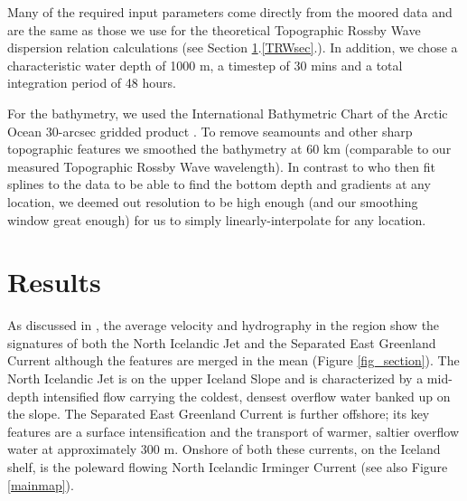 \documentclass[12pt,titlepage,figuresatend]{article}
\begin{document}
Many of the required input parameters come directly from the moored data and are the same as those we use for the theoretical Topographic Rossby Wave dispersion relation calculations (see Section \ref{results}.\ref{TRWsec}.). In addition, we chose a characteristic water depth of 1000 m, a timestep of 30 mins and a total integration period of 48 hours.

For the bathymetry, we used the International Bathymetric Chart of the Arctic Ocean 30-arcsec gridded product \cite[]{Jakobsson2012}. To remove seamounts and other sharp topographic features we smoothed the bathymetry at 60 km (comparable to our measured Topographic Rossby Wave wavelength). In contrast to \cite{Pickart1995} who then fit splines to the data to be able to find the bottom depth and gradients at any location, we deemed out resolution to be high enough (and our smoothing window great enough) for us to simply linearly-interpolate for any location.

\section{Results}
\label{results}

As discussed in \cite{Harden2016}, the average velocity and hydrography in the region show the signatures of both the North Icelandic Jet and the Separated East Greenland Current although the features are merged in the mean (Figure \ref{fig_section}). The North Icelandic Jet is on the upper Iceland Slope and is characterized by a mid-depth intensified flow carrying the coldest, densest overflow water banked up on the slope. The Separated East Greenland Current is further offshore; its key features are a surface intensification and the transport of warmer, saltier overflow water at approximately 300 m. Onshore of both these currents, on the Iceland shelf, is the poleward flowing North Icelandic Irminger Current (see also Figure \ref{mainmap}).
\end{document}
